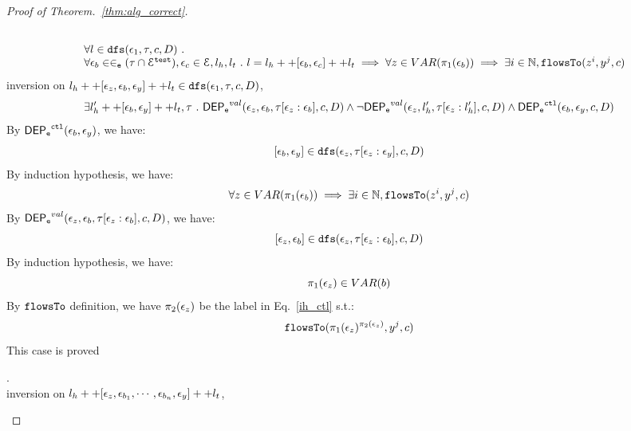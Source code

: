 \documentclass[a4paper,11pt]{article}
\begin{document}
\begin{proof}[Proof of Theorem.~\ref{thm:alg_correct}]
\begin{case}
\begin{subcase}
\[\begin{array}{l}
  \\ \quad 
   \forall l \in \mathtt{dfs}(\mathtt{\epsilon}_1, \mathtt{\tau}, c, D) ~.~
   \\ \quad 
   \forall \mathtt{\epsilon}_b \in \in_{\mathtt{e}} (\mathtt{\tau} \cap \mathcal{E}^{\mathtt{{test}}}), \mathtt{\epsilon}_c \in \mathcal{E}, l_h, l_t ~.~ 
   l = l_h ++ [ \mathtt{\epsilon}_b, \mathtt{\epsilon}_c] ++ l_t 
   \implies \forall z \in VAR(\pi_1(\mathtt{\epsilon}_b)) \implies \exists i \in \mathbb{N}, \mathtt{flowsTo}(z^i, y^j, c)
\end{array}
\]
inversion on  $l_h ++ {[\mathtt{\epsilon}_z,  \mathtt{\epsilon}_b, \mathtt{\epsilon}_y]} ++ l_t \in \mathtt{dfs}(\mathtt{\epsilon}_1, \mathtt{\tau}, c, D)$, 
\[
  \exists l_{h}' ++ [\mathtt{\epsilon}_b, \mathtt{\epsilon}_y] ++ l_t, \mathtt{\tau} ~.~
  \mathsf{DEP_{\mathtt{e}}}^{val}(\mathtt{\epsilon}_z, \mathtt{\epsilon}_b, \mathtt{\tau}[\mathtt{\epsilon}_z: \mathtt{\epsilon}_b], c, D)
  \land 
  \neg \mathsf{DEP_{\mathtt{e}}}^{val} (\mathtt{\epsilon}_z, l_h', \mathtt{\tau}[\mathtt{\epsilon}_z: l_h'], c, D)
  \land 
  \mathsf{DEP_{\mathtt{e}}}^{\mathtt{{ctl}}} (\mathtt{\epsilon}_b, \mathtt{\epsilon}_y, c, D)
\]
%
By $\mathsf{DEP_{\mathtt{e}}}^{\mathtt{{ctl}}} (\mathtt{\epsilon}_b, \mathtt{\epsilon}_y) $, we have:
\[
  [\mathtt{\epsilon}_b, \mathtt{\epsilon}_y]\in \mathtt{dfs}(\mathtt{\epsilon}_{z}, \mathtt{\tau}[\mathtt{\epsilon}_{z}:\mathtt{\epsilon}_{y}], c, D)
\]
%
By induction hypothesis, we have:
\begin{equation}
\label{ih_ctl}
  \forall z \in VAR(\pi_1(\mathtt{\epsilon}_b)) \implies \exists i \in \mathbb{N}, \mathtt{flowsTo}(z^i, y^j, c)
\end{equation}
%
By $\mathsf{DEP_{\mathtt{e}}}^{val}(\mathtt{\epsilon}_z, \mathtt{\epsilon}_b, \mathtt{\tau}[\mathtt{\epsilon}_z: \mathtt{\epsilon}_b], c, D)$, we have:
\[
  [\mathtt{\epsilon}_z, \mathtt{\epsilon}_b]\in \mathtt{dfs}(\mathtt{\epsilon}_{z}, \mathtt{\tau}[\mathtt{\epsilon}_{z}:\mathtt{\epsilon}_{b}], c, D)
\]
%
By induction hypothesis, we have:
\[
  \pi_1(\mathtt{\epsilon}_z) \in VAR(b)
\]
%
By $\mathtt{flowsTo}$ definition, we have $\pi_2(\mathtt{\epsilon}_z)$ be the label in Eq.~\ref{ih_ctl} s.t.:
\[
  \mathtt{flowsTo}(\pi_1(\mathtt{\epsilon}_z)^{\pi_2(\mathtt{\epsilon}_z)}, y^j, c)
\]
%
This case is proved
%
%
\end{subcase}
%
\begin{subcase}.
\\
inversion on  $l_h ++ {[\mathtt{\epsilon}_z,  \mathtt{\epsilon}_{b_1}, \cdots, \mathtt{\epsilon}_{b_n},\mathtt{\epsilon}_y]} ++ l_t$, 

\end{subcase}
\end{case}
\end{proof}
\end{document}
